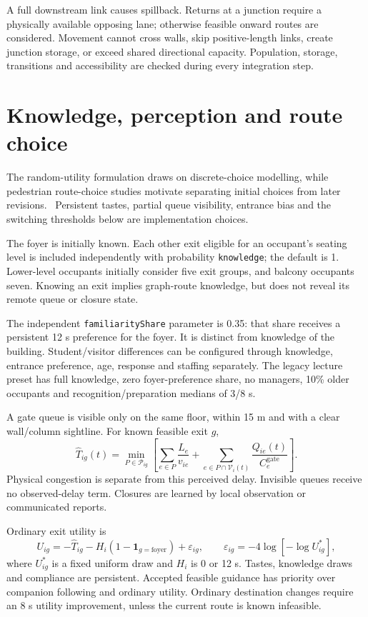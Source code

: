 \documentclass[11pt,a4paper]{article}
\begin{document}
A full downstream link causes spillback. Returns at a junction require a physically available opposing lane; otherwise feasible onward routes are considered. Movement cannot cross walls, skip positive-length links, create junction storage, or exceed shared directional capacity. Population, storage, transitions and accessibility are checked during every integration step.

\section{Knowledge, perception and route choice}
The random-utility formulation draws on discrete-choice modelling, while pedestrian route-choice studies motivate separating initial choices from later revisions.~\cite{train,liao} Persistent tastes, partial queue visibility, entrance bias and the switching thresholds below are implementation choices.~\cite{model,implementation}

The foyer is initially known. Each other exit eligible for an occupant's seating level is included independently with probability \texttt{knowledge}; the default is 1. Lower-level occupants initially consider five exit groups, and balcony occupants seven. Knowing an exit implies graph-route knowledge, but does not reveal its remote queue or closure state.

The independent \texttt{familiarityShare} parameter is 0.35: that share receives a persistent 12 s preference for the foyer. It is distinct from knowledge of the building. Student/visitor differences can be configured through knowledge, entrance preference, age, response and staffing separately. The legacy lecture preset has full knowledge, zero foyer-preference share, no managers, 10\% older occupants and recognition/preparation medians of 3/8 s.

A gate queue is visible only on the same floor, within 15 m and with a clear wall/column sightline. For known feasible exit $g$,
\[
\widehat T_{ig}(t)=\min_{P\in\mathcal P_{ig}}
\left[\sum_{e\in P}\frac{L_e}{v_{ie}}
+\sum_{e\in P\cap\mathcal V_i(t)}\frac{Q_{ie}(t)}{C_e^{\mathrm{gate}}}\right].
\]
Physical congestion is separate from this perceived delay. Invisible queues receive no observed-delay term. Closures are learned by local observation or communicated reports.

Ordinary exit utility is
\[
U_{ig}=-\widehat T_{ig}-H_i(1-\mathbf1_{g=\mathrm{foyer}})+\varepsilon_{ig},
\qquad \varepsilon_{ig}=-4\log[-\log U_{ig}^{*}],
\]
where $U_{ig}^{*}$ is a fixed uniform draw and $H_i$ is 0 or 12 s. Tastes, knowledge draws and compliance are persistent. Accepted feasible guidance has priority over companion following and ordinary utility. Ordinary destination changes require an 8 s utility improvement, unless the current route is known infeasible.
\end{document}
